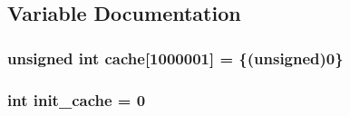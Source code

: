 \subsection{Variable Documentation}
\hypertarget{SphereCollatz_8c_09_09_a117b8639e485388b199bd815b5490f1e}{
\subsubsection[{cache}]{\setlength{\rightskip}{0pt plus 5cm}unsigned int cache\mbox{[}1000001\mbox{]} = \{(unsigned)0\}}}\label{SphereCollatz_8c_09_09_a117b8639e485388b199bd815b5490f1e}
\hypertarget{SphereCollatz_8c_09_09_a4aec11a6e1b7cdca65df7232bfecb3de}{
\subsubsection[{init\-\_\-cache}]{\setlength{\rightskip}{0pt plus 5cm}int init\-\_\-cache = 0}}\label{SphereCollatz_8c_09_09_a4aec11a6e1b7cdca65df7232bfecb3de}
